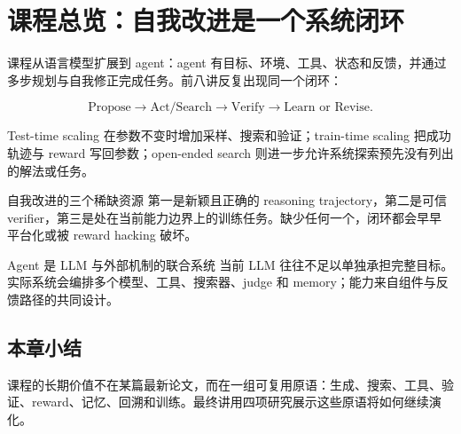 \section{课程总览：自我改进是一个系统闭环}

课程从语言模型扩展到 agent：agent 有目标、环境、工具、状态和反馈，并通过多步规划与自我修正完成任务。前八讲反复出现同一个闭环：

$$
\text{Propose}\rightarrow \text{Act/Search}\rightarrow
\text{Verify}\rightarrow \text{Learn or Revise}.
$$

Test-time scaling 在参数不变时增加采样、搜索和验证；train-time scaling 把成功轨迹与 reward 写回参数；open-ended search 则进一步允许系统探索预先没有列出的解法或任务。



\begin{importantbox}{自我改进的三个稀缺资源}
第一是新颖且正确的 reasoning trajectory，第二是可信 verifier，第三是处在当前能力边界上的训练任务。缺少任何一个，闭环都会早早平台化或被 reward hacking 破坏。
\end{importantbox}

\begin{knowledgebox}{Agent 是 LLM 与外部机制的联合系统}
当前 LLM 往往不足以单独承担完整目标。实际系统会编排多个模型、工具、搜索器、judge 和 memory；能力来自组件与反馈路径的共同设计。
\end{knowledgebox}

\subsection{本章小结}

课程的长期价值不在某篇最新论文，而在一组可复用原语：生成、搜索、工具、验证、reward、记忆、回溯和训练。最终讲用四项研究展示这些原语将如何继续演化。

